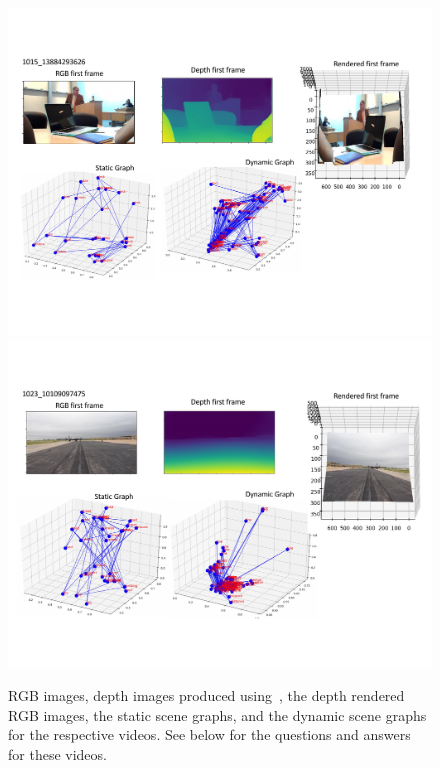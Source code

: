 \documentclass[letterpaper]{article} %
\begin{document}
\begin{figure}
    \centering
    \includegraphics[width=16cm,trim={0cm 3cm 0cm 3.0cm},clip]{./figs/sg_quals_3.pdf}
     \includegraphics[width=16cm,trim={0cm 3cm 0cm 3.0cm},clip]{./figs/sg_quals_4.pdf}
    \caption{RGB images, depth images produced using~\cite{ranftl2019towards}, the depth rendered RGB images, the static scene graphs, and the dynamic scene graphs for the respective videos. See below for the questions and answers for these videos.}
    \label{fig:quals_2}
\end{figure}
\end{document}
